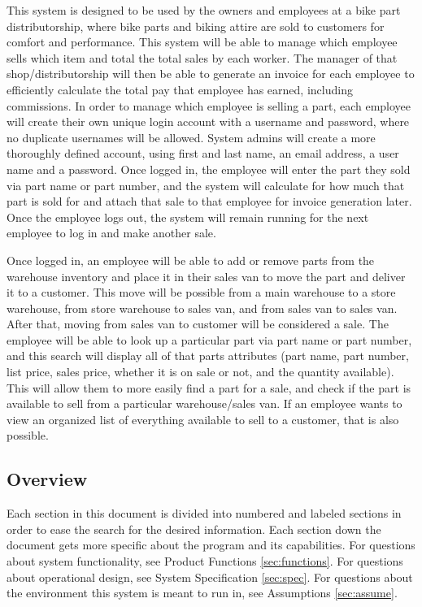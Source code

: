 \documentclass{report}
\begin{document}
This system is designed to be used by the owners and employees at a bike part distributorship, where bike parts and biking attire are sold to customers for comfort and performance. This system will be able to manage which employee sells which item and total the total sales by each worker. The manager of that shop/distributorship will then be able to generate an invoice for each employee to efficiently calculate the total pay that employee has earned, including commissions. In order to manage which employee is selling a part, each employee will create their own unique login account with a username and password, where no duplicate usernames will be allowed. System admins will create a more thoroughly defined account, using first and last name, an email address, a user name and a password. Once logged in, the employee will enter the part they sold via part name or part number, and the system will calculate for how much that part is sold for and attach that sale to that employee for invoice generation later. Once the employee logs out, the system will remain running for the next employee to log in and make another sale.\par
Once logged in, an employee will be able to add or remove parts from the warehouse inventory and place it in their sales van to move the part and deliver it to a customer. This move will be possible from a main warehouse to a store warehouse, from store warehouse to sales van, and from sales van to sales van. After that, moving from sales van to customer will be considered a sale. The employee will be able to look up a particular part via part name or part number, and this search will display all of that parts attributes (part name, part number, list price, sales price, whether it is on sale or not, and the quantity available). This will allow them to more easily find a part for a sale, and check if the part is available to sell from a particular warehouse/sales van. If an employee wants to view an organized list of everything available to sell to a customer, that is also possible.\par

\subsection{Overview}

Each section in this document is divided into numbered and labeled sections in order to ease the search for the desired information. Each section down the document gets more specific about the program and its capabilities. For questions about system functionality, see Product Functions \ref{sec:functions}. For questions about operational design, see System Specification \ref{sec:spec}. For questions about the environment this system is meant to run in, see Assumptions \ref{sec:assume}.\par
\end{document}
